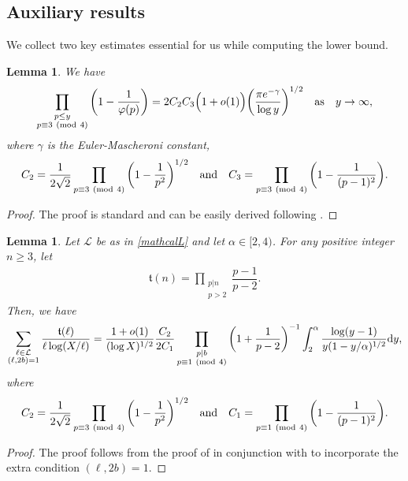 \documentclass[12pt]{amsart}
\numberwithin{equation}{section}
\newtheorem{lemma}[theorem]{Lemma}
\theoremstyle{remark}
\theoremstyle{definition}
\newcommand{\imod}[1]{\ (\mathrm{mod}\ #1)}
\begin{document}
\subsection{Auxiliary results} We collect two key estimates essential for us while computing the lower bound.
\begin{lemma}\label{Aux1}
We have
\begin{align}
\notag \prod_{\substack{p\leq y\\p\equiv 3\imod 4}}\bigg(1-\dfrac{1}{\varphi(p)}\bigg)=2C_2C_3\Big(1+o(1)\Big)\bigg(\dfrac{\pi e^{-\gamma}}{\log y}\bigg)^{1/2} \quad \text{as} \quad y\rightarrow\infty,
\end{align}
where $\gamma$ is the Euler-Mascheroni constant,
\begin{align}
\notag C_2=\dfrac{1}{2\sqrt{2}}\prod_{p\equiv 3\imod 4}\bigg(1-\dfrac{1}{p^2}\bigg)^{1/2}\quad \text{and}\quad C_3=\prod_{p\equiv 3\imod 4}\bigg(1-\dfrac{1}{(p-1)^2}\bigg).
\end{align}
\end{lemma}
\begin{proof}
The proof is standard and can be easily derived following \cite[pp.~277--278]{opera}.
\end{proof}



\begin{lemma}\label{Aux2}
Let $\mathcal{L}$ be as in \eqref{mathcalL} and let $\alpha \in [2, 4)$. For any positive integer $n\geq 3$, let
\begin{align}\label{eq: mathfrakt}
    \mathfrak{t}(n) = \prod_{\substack{p|n\\ p>2}}\dfrac{p-1}{p-2}.
\end{align} Then, we have
\begin{align}
\notag \sum_{\substack{\ell \in \mathcal{L}\\ (\ell, 2b)=1}}\dfrac{\mathfrak{t}(\ell)}{\ell \log (X/\ell)}=\dfrac{1+o(1)}{(\log X)^{1/2}}\dfrac{C_2}{2C_1}\prod_{\substack{p|b\\p\equiv 1\imod 4}}\bigg(1+\dfrac{1}{p-2}\bigg)^{-1}\int_{2}^\alpha \dfrac{\log (y-1)}{y(1-y/\alpha)^{1/2}}\textup{d}y,
\end{align}
where 
\begin{align}
\notag C_2=\dfrac{1}{2\sqrt{2}}\prod_{p\equiv 3\imod 4}\bigg(1-\dfrac{1}{p^2}\bigg)^{1/2}\quad \text{and}\quad C_1=\prod_{p\equiv 1\imod 4}\bigg(1-\dfrac{1}{(p-1)^2}\bigg).
\end{align}
\end{lemma}
\begin{proof}
The proof follows from the proof of \cite[Lemma 5]{Mat2} in conjunction with \cite[Satz 1]{Wir} to incorporate the extra condition $(\ell, 2b)=1$.
\end{proof}
\end{document}
